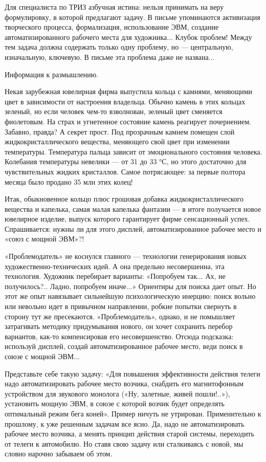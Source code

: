 Для  специалиста по  ТРИЗ азбучная  истина: нельзя  принимать на  веру
формулировку,  в  которой  предлагают  задачу.  В  письме  упоминаются
активизация  творческого  процесса, формализация,  использование  ЭВМ,
создание  автоматизированного рабочего  места для  художника... Клубок
проблем! Между тем задача должна  содержать только одну проблему, но —
центральную,  изначальную, ключевую.  В  письме эта  проблема даже  не
названа...

Информация к размышлению.

Некая зарубежная ювелирная фирма выпустила кольца с камнями, меняющими
цвет  в зависимости  от  настроения владельца.  Обычно  камень в  этих
кольцах  зеленый,  но если  человек  чем-то  взволнован, зеленый  цвет
сменяется фиолетовым. На страх и угнетенное состояние камень реагирует
почернением. Забавно,  правда? А  секрет прост. Под  прозрачным камнем
помещен слой  жидкокристаллического вещества, меняющего свой  цвет при
изменении  температуры. Температура  пальца зависит  от эмоционального
состояния человека. Колебания  температуры невелики — от 31  до 33 °С,
но  этого  достаточно  для  чувствительных  жидких  кристаллов.  Самое
потрясающее: за первые полтора месяца было продано 35 млн этих колец!

Итак, обыкновенное кольцо  плюс грошовая добавка жидкокристаллического
вещества  и  капелька,  самая  малая   капелька  фантазии  —  в  итоге
получается  новое  ювелирное   изделие,  выпуск  которого  гарантирует
фирме сенсационный  успех. Спрашивается:  нужны ли для  этого дисплей,
автоматизированное рабочее место и «союз с мощной ЭВМ»?!

«Проблемодатель» не коснулся главного — технологии генерирования новых
художественно-технических  идей.  А  она предельно  несовершенна,  эта
технология.  Художник перебирает  варианты: «Попробуем  так... Ах,  не
получилось?..  Ладно, попробуем  иначе...» Ориентиры  для поиска  дает
опыт. Но  этот же опыт навязывает  сильнейшую психологическую инерцию:
поиск вольно или невольно идет в привычном направлении, робкие попытки
свернуть в сторону тут же  пресекаются. «Проблемодатель», однако, и не
помышляет затрагивать методику придумывания нового, он хочет сохранить
перебор  вариантов, как-то  компенсировав  его несовершенство.  Отсюда
подсказка: используй дисплей, создай автоматизированное рабочее место,
веди поиск в союзе с мощной ЭВМ...

Представьте себе  такую задачу: «Для повышения  эффективности действия
телеги  надо  автоматизировать  рабочее место  возчика,  снабдить  его
магнитофонным устройством для звукового монолога («Ну, залетные, живей
пошли!..»),  установить мощную  ЭВМ, в  союзе с  которой возчик  будет
определять оптимальный режим бега  коней». Пример ничуть не утрирован.
Применительно к прошлому, к уже решенным задачам все ясно. Да, надо не
автоматизировать  рабочее место  возчика,  а  менять принцип  действия
старой  системы, переходить  от  телеги к  автомобилю.  Но ставя  свою
задачу или сталкиваясь с новой, мы словно нарочно забываем об этом.

